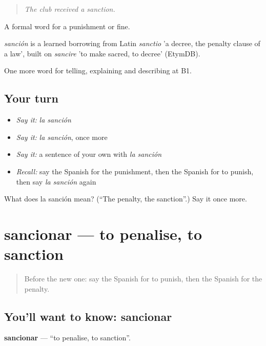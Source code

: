 \begin{quote}
\emph{The club received a sanction.}
\end{quote}

A formal word for a punishment or fine.

\begin{cousinweb}
\emph{sanción} is a learned borrowing from Latin \emph{sanctio} 'a decree, the penalty clause of a law', built on \emph{sancire} 'to make sacred, to decree' (EtymDB).
\end{cousinweb}

\begin{grammarlens}[title={What you've built}]
One more word for telling, explaining and describing at B1.
\end{grammarlens}

\subsection*{Your turn}
\begin{itemize}
\raggedright
  \item \emph{Say it:} \emph{la sanción}
  \item \emph{Say it:} \emph{la sanción}, once more
  \item \emph{Say it:} a sentence of your own with \emph{la sanción}
  \item \emph{Recall:} say the Spanish for the punishment, then the Spanish for to punish, then say \emph{la sanción} again
\end{itemize}

\begin{tcolorbox}[breakable,colback=teal!4,colframe=teal!35!black,title={Before you move on}]
What does la sanción mean? (\textquotedblleft{}The penalty, the sanction\textquotedblright{}.) Say it once more.
\end{tcolorbox}
\section[sancionar]{sancionar — to penalise, to sanction}

\label{lesson:ES-C623-sancionar}



\begin{quote}
Before the new one: say the Spanish for to punish, then the Spanish for the penalty.
\end{quote}

\subsection*{You'll want to know: sancionar}
\textbf{sancionar} — \textquotedblleft{}to penalise, to sanction\textquotedblright{}.

